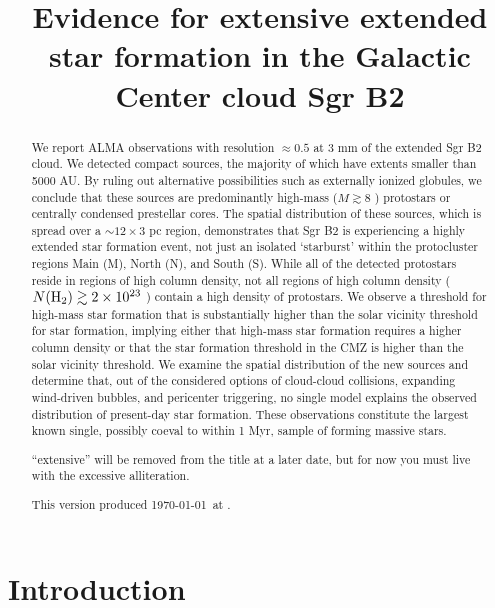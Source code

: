 \documentclass[twocolumn]{aastex61}
\begin{document}
\title{Evidence for extensive extended star formation in the Galactic Center
cloud Sgr B2}

\begin{abstract}
We report ALMA observations with resolution $\approx0.5$ \arcsec at 3 mm  of
the extended Sgr B2 cloud. We detected \ncores compact sources, the majority of
which have extents smaller than 5000 AU.  By ruling out alternative
possibilities such as externally ionized
globules, we conclude that these sources are predominantly high-mass
($M\gtrsim8$ \msun) protostars or centrally condensed prestellar cores.  The
spatial distribution of these
sources, which is spread over a $\sim12\times3$ pc region, demonstrates that
Sgr B2 is experiencing a highly extended star
formation event, not just an isolated `starburst' within the protocluster
regions Main (M), North (N), and South (S).  While all of the detected
protostars reside in regions of high column density, not all regions of high
column density
($N(\textrm{H}_{2})\gtrsim2\times10^{23}$ \persc)
contain a high density of
protostars.  We observe a threshold for high-mass star formation that is
substantially higher than the solar vicinity threshold for star formation, implying
either that high-mass star formation requires a higher column density or that
the star formation threshold in the CMZ is higher than the solar vicinity
threshold.
We examine the spatial distribution of the new sources and determine that, out
of the considered options of cloud-cloud collisions, expanding wind-driven
bubbles, and pericenter triggering, no single model explains the observed
distribution of present-day star formation.
These observations constitute the largest known single, possibly
coeval to within 1 Myr, sample of forming massive stars.

{\color{red}``extensive'' will be removed from the title at a later date,
but for now you must live with the excessive alliteration.}

This version produced \today\ at \currenttime.
\end{abstract}




\section{Introduction}
\end{document}
